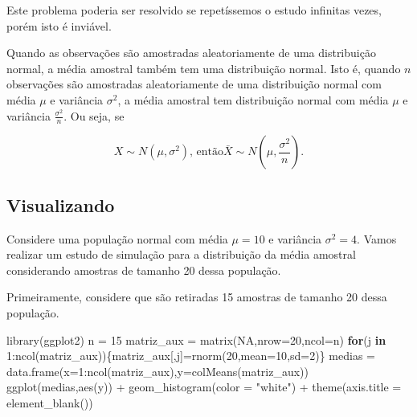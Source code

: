 \documentclass[
]{book}
\newenvironment{Shaded}{\begin{snugshade}}{\end{snugshade}}
\newcommand{\AttributeTok}[1]{\textcolor[rgb]{0.77,0.63,0.00}{#1}}
\newcommand{\ConstantTok}[1]{\textcolor[rgb]{0.00,0.00,0.00}{#1}}
\newcommand{\ControlFlowTok}[1]{\textcolor[rgb]{0.13,0.29,0.53}{\textbf{#1}}}
\newcommand{\DecValTok}[1]{\textcolor[rgb]{0.00,0.00,0.81}{#1}}
\newcommand{\FunctionTok}[1]{\textcolor[rgb]{0.00,0.00,0.00}{#1}}
\newcommand{\NormalTok}[1]{#1}
\newcommand{\OtherTok}[1]{\textcolor[rgb]{0.56,0.35,0.01}{#1}}
\newcommand{\SpecialCharTok}[1]{\textcolor[rgb]{0.00,0.00,0.00}{#1}}
\newcommand{\StringTok}[1]{\textcolor[rgb]{0.31,0.60,0.02}{#1}}
\begin{document}
Este problema poderia ser resolvido se repetíssemos o estudo infinitas vezes, porém isto é inviável.

Quando as observações são amostradas aleatoriamente de uma distribuição normal, a média amostral também tem uma distribuição normal. Isto é, quando \(n\) observações são amostradas aleatoriamente de uma distribuição normal com média \(\mu\) e variância \(\sigma^2\), a média amostral tem distribuição normal com média \(\mu\) e variância \(\frac{\sigma^2}{n}\). Ou seja, se

\[X\sim N(\mu,\sigma^2)\text{, então} \bar X \sim N\left(\mu,\frac{\sigma^2}{n}\right).\]

\hypertarget{visualizando}{%
\subsection{Visualizando}\label{visualizando}}

Considere uma população normal com média \(\mu=10\) e variância \(\sigma^2=4\). Vamos realizar um estudo de simulação para a distribuição da média amostral considerando amostras de tamanho 20 dessa população.

Primeiramente, considere que são retiradas 15 amostras de tamanho 20 dessa população.

\begin{Shaded}
\begin{Highlighting}[]
\FunctionTok{library}\NormalTok{(ggplot2)}
\NormalTok{n }\OtherTok{=} \DecValTok{15}
\NormalTok{matriz\_aux }\OtherTok{=} \FunctionTok{matrix}\NormalTok{(}\ConstantTok{NA}\NormalTok{,}\AttributeTok{nrow=}\DecValTok{20}\NormalTok{,}\AttributeTok{ncol=}\NormalTok{n)}
\ControlFlowTok{for}\NormalTok{(j }\ControlFlowTok{in} \DecValTok{1}\SpecialCharTok{:}\FunctionTok{ncol}\NormalTok{(matriz\_aux))\{matriz\_aux[,j]}\OtherTok{=}\FunctionTok{rnorm}\NormalTok{(}\DecValTok{20}\NormalTok{,}\AttributeTok{mean=}\DecValTok{10}\NormalTok{,}\AttributeTok{sd=}\DecValTok{2}\NormalTok{)\}}
\NormalTok{medias }\OtherTok{=} \FunctionTok{data.frame}\NormalTok{(}\AttributeTok{x=}\DecValTok{1}\SpecialCharTok{:}\FunctionTok{ncol}\NormalTok{(matriz\_aux),}\AttributeTok{y=}\FunctionTok{colMeans}\NormalTok{(matriz\_aux))}
\FunctionTok{ggplot}\NormalTok{(medias,}\FunctionTok{aes}\NormalTok{(y)) }\SpecialCharTok{+}
  \FunctionTok{geom\_histogram}\NormalTok{(}\AttributeTok{color =} \StringTok{"white"}\NormalTok{) }\SpecialCharTok{+}
  \FunctionTok{theme}\NormalTok{(}\AttributeTok{axis.title =} \FunctionTok{element\_blank}\NormalTok{())}
\end{Highlighting}
\end{Shaded}
\end{document}
